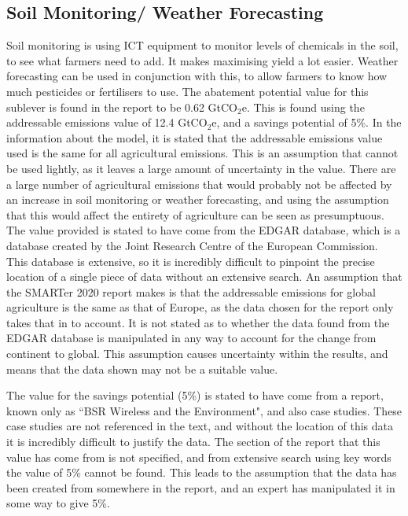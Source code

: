 \subsection{Soil Monitoring/ Weather Forecasting}
Soil monitoring is using ICT equipment to monitor levels of chemicals in the soil, to see what farmers need to add. It makes maximising yield a lot easier. Weather forecasting can be used in conjunction with this, to allow farmers to know how much pesticides or fertilisers to use. 
The abatement potential value for this sublever is found in the report to be 0.62 GtCO$_2$e. This is found using the addressable emissions value of 12.4 GtCO$_2$e, and a savings potential of 5\%. 
In the information about the model, it is stated that the addressable emissions value used is the same for all agricultural emissions. This is an assumption that cannot be used lightly, as it leaves a large amount of uncertainty in the value. There are a large number of agricultural emissions that would probably not be affected by an increase in soil monitoring or weather forecasting, and using the assumption that this would affect the entirety of agriculture can be seen as presumptuous. 
The value provided is stated to have come from the EDGAR database, which is a database created by the Joint Research Centre of the European Commission. This database is extensive, so it is incredibly difficult to pinpoint the precise location of a single piece of data without an extensive search. 
An assumption that the SMARTer 2020 report makes is that the addressable emissions for global agriculture is the same as that of Europe, as the data chosen for the report only takes that in to account. It is not stated as to whether the data found from the EDGAR database is manipulated in any way to account for the change from continent to global. This assumption causes uncertainty within the results, and means that the data shown may not be a suitable value.

The value for the savings potential (5\%) is stated to have come from a report, known only as ``BSR Wireless and the Environment", and also case studies. These case studies are not referenced in the text, and without the location of this data it is incredibly difficult to justify the data. The section of the report that this value has come from is not specified, and from extensive search using key words the value of 5\% cannot be found. This leads to the assumption that the data has been created from somewhere in the report, and an expert has manipulated it in some way to give 5\%.

